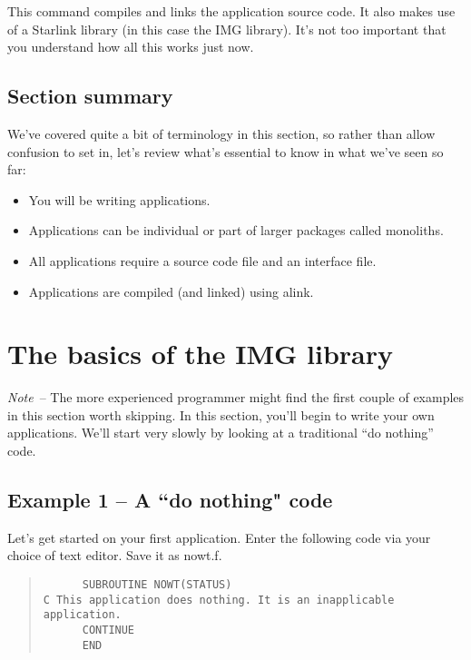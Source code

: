 This command compiles and links the application source code. It
also makes use of a Starlink library (in this case the IMG library).
It's not too important that you understand how all this works just
now.

\subsection{Section summary}

We've covered quite a bit of terminology in this section, so rather than
allow confusion to set in, let's review what's essential to know in
what we've seen so far:

\begin{itemize}
\item You will be writing applications.
\item Applications can be individual or part of larger packages
called monoliths.
\item All applications require a source code file and an interface file.
\item Applications are compiled (and linked) using {\sf alink}.
\end{itemize}

\section{The basics of the IMG library}

      {\em Note}\, -- The more experienced programmer might find the first
      couple of examples in this section worth skipping.
      In this section, you'll begin to write your own applications. We'll
      start very slowly by looking at a traditional ``do nothing'' code.

\subsection{Example 1 -- A ``do nothing" code}

      Let's get started on your first application. Enter the following
      code via your choice of text editor. Save it as {\sf nowt.f}.

\begin{quote}
{\small
\begin{verbatim}
      SUBROUTINE NOWT(STATUS)
C This application does nothing. It is an inapplicable application.
      CONTINUE
      END
\end{verbatim}
}
\end{quote}

